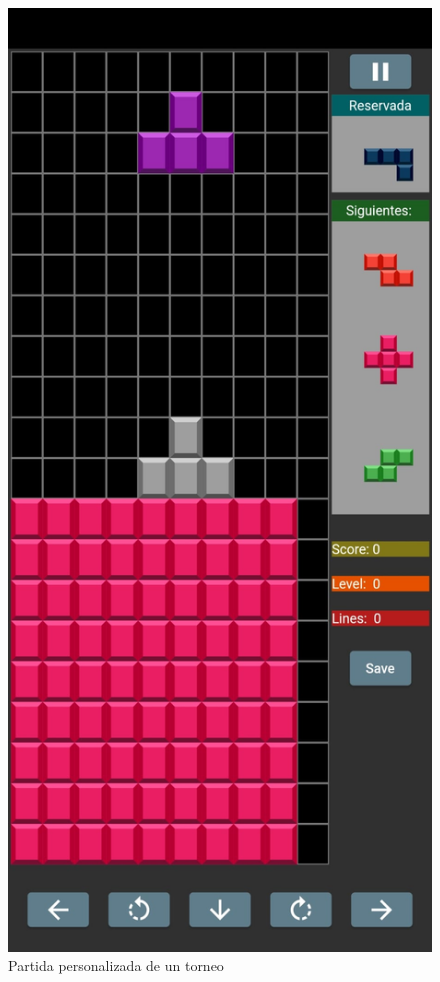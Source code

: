 \documentclass{article}
\begin{document}
\begin{figure}[H]
  \includegraphics[width=\textwidth]{imagenes/piezasRosas.jpeg}
  \caption{Partida personalizada de un torneo} 
\end{figure}
\end{document}
